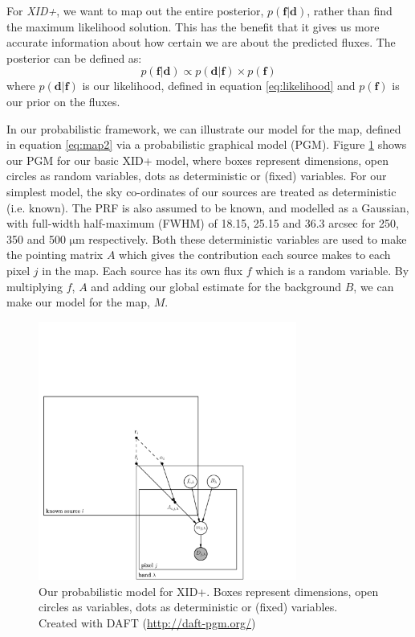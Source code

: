 \documentclass[useAMS,usenatbib]{mnras}
\begin{document}
%

For \emph{XID+}, we want to map out the entire posterior, $p(\mathbf{f}|\mathbf{d})$, rather than find the maximum likelihood solution. This has the benefit that it gives us more accurate information about how certain we are about the predicted fluxes. The posterior can be defined as:
\begin{equation}
p(\mathbf{f}|\mathbf{d}) \propto p(\mathbf{d}|\mathbf{f}) \times p(\mathbf{f})
\end{equation}
where $p(\mathbf{d}|\mathbf{f})$ is our likelihood, defined in equation \ref{eq:likelihood} and $p(\mathbf{f})$ is our prior on the fluxes. 

In our probabilistic framework, we can illustrate our model for the map, defined in equation \ref{eq:map2} via a probabilistic graphical model (PGM). Figure \ref{fig:graph_mod_xid+} shows our PGM for our basic XID+ model, where boxes represent dimensions, open circles as random variables, dots as deterministic or (fixed) variables. For our simplest model, the sky co-ordinates of our sources are treated as deterministic (i.e. known). The PRF is also assumed to be known, and modelled as a Gaussian, with full-width half-maximum (FWHM) of 18.15, 25.15 and 36.3 arcsec for 250, 350 and 500 $\mathrm{\mu m}$ respectively. Both these deterministic variables are used to make the pointing matrix $A$ which gives the contribution each source makes to each pixel $j$ in the map. Each source has its own flux $f$ which is a random variable. By multiplying $f$, $A$ and adding our global estimate for the background $B$, we can make our model for the map, $M$. 
\begin{figure}
\includegraphics[width=8.5cm]{./graphical_model.pdf}
\caption{Our probabilistic model for XID+. Boxes represent dimensions, open circles as variables, dots as deterministic or (fixed) variables. Created with DAFT (\url{http://daft-pgm.org/})}\label{fig:graph_mod_xid+}
\end{figure}
 
\end{document}
